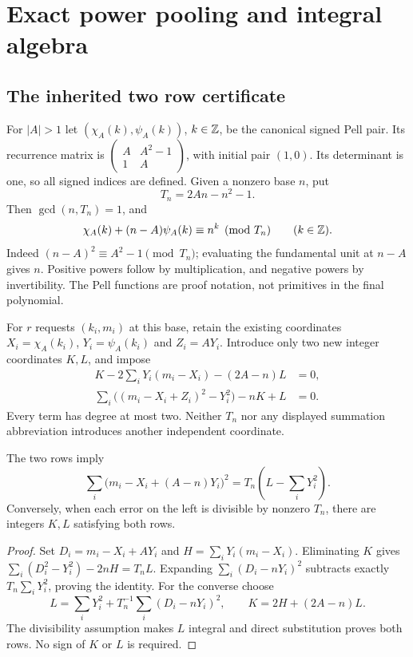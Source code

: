 \section{Exact power pooling and integral algebra}
\subsection{The inherited two row certificate}
For $|A|>1$ let $(\chi_A(k),\psi_A(k))$, $k\in\mathbb Z$, be the canonical
signed Pell pair. Its recurrence matrix is
$\left(\begin{smallmatrix}A&A^2-1\\1&A\end{smallmatrix}\right)$,
with initial pair $(1,0)$. Its determinant is one, so all signed indices
are defined. Given a nonzero base $n$, put
\[
 T_n=2An-n^2-1.
\]
Then $\gcd(n,T_n)=1$, and
\begin{equation}\label{eq:pooled-congruence}
 \chi_A(k)+(n-A)\psi_A(k)\equiv n^k\pmod{T_n}
 \qquad(k\in\mathbb Z).
\end{equation}
Indeed $(n-A)^2\equiv A^2-1\pmod{T_n}$; evaluating the fundamental
unit at $n-A$ gives $n$. Positive powers follow by multiplication,
and negative powers by invertibility. The Pell functions are proof
notation, not primitives in the final polynomial.

For $r$ requests $(k_i,m_i)$ at this base, retain the existing coordinates
$X_i=\chi_A(k_i)$, $Y_i=\psi_A(k_i)$ and $Z_i=AY_i$.
Introduce only two new integer coordinates $K,L$, and impose
\begin{align}
 K-2\sum_iY_i(m_i-X_i)-(2A-n)L&=0,\label{eq:pool-row1}\\
 \sum_i\bigl((m_i-X_i+Z_i)^2-Y_i^2\bigr)-nK+L&=0.
 \label{eq:pool-row2}
\end{align}
Every term has degree at most two. Neither $T_n$ nor any displayed
summation abbreviation introduces another independent coordinate.

\begin{lemma}\label{lem:pooled-identity}
The two rows imply
\[
 \sum_i\bigl(m_i-X_i+(A-n)Y_i\bigr)^2
 =T_n\left(L-\sum_iY_i^2\right).
\]
Conversely, when each error on the left is divisible by nonzero $T_n$,
there are integers $K,L$ satisfying both rows.
\end{lemma}
\begin{proof}
Set $D_i=m_i-X_i+AY_i$ and $H=\sum_iY_i(m_i-X_i)$.
Eliminating $K$ gives
$\sum_i(D_i^2-Y_i^2)-2nH=T_nL$.
Expanding $\sum_i(D_i-nY_i)^2$ subtracts exactly
$T_n\sum_iY_i^2$, proving the identity. For the converse choose
\[
 L=\sum_iY_i^2+T_n^{-1}\sum_i(D_i-nY_i)^2,
 \qquad K=2H+(2A-n)L.
\]
The divisibility assumption makes $L$ integral and direct substitution
proves both rows. No sign of $K$ or $L$ is required.
\end{proof}

